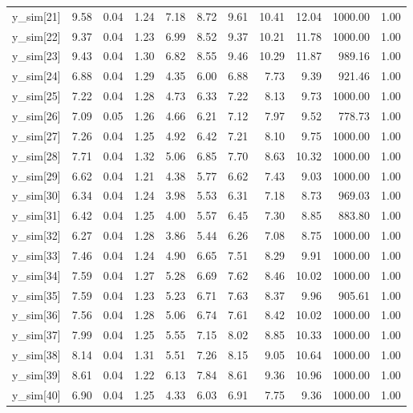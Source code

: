 \begin{table}[ht]
\begin{tabular}{rrrrrrrrrrr}
  y\_sim[21] & 9.58 & 0.04 & 1.24 & 7.18 & 8.72 & 9.61 & 10.41 & 12.04 & 1000.00 & 1.00 \\ 
  y\_sim[22] & 9.37 & 0.04 & 1.23 & 6.99 & 8.52 & 9.37 & 10.21 & 11.78 & 1000.00 & 1.00 \\ 
  y\_sim[23] & 9.43 & 0.04 & 1.30 & 6.82 & 8.55 & 9.46 & 10.29 & 11.87 & 989.16 & 1.00 \\ 
  y\_sim[24] & 6.88 & 0.04 & 1.29 & 4.35 & 6.00 & 6.88 & 7.73 & 9.39 & 921.46 & 1.00 \\ 
  y\_sim[25] & 7.22 & 0.04 & 1.28 & 4.73 & 6.33 & 7.22 & 8.13 & 9.73 & 1000.00 & 1.00 \\ 
  y\_sim[26] & 7.09 & 0.05 & 1.26 & 4.66 & 6.21 & 7.12 & 7.97 & 9.52 & 778.73 & 1.00 \\ 
  y\_sim[27] & 7.26 & 0.04 & 1.25 & 4.92 & 6.42 & 7.21 & 8.10 & 9.75 & 1000.00 & 1.00 \\ 
  y\_sim[28] & 7.71 & 0.04 & 1.32 & 5.06 & 6.85 & 7.70 & 8.63 & 10.32 & 1000.00 & 1.00 \\ 
  y\_sim[29] & 6.62 & 0.04 & 1.21 & 4.38 & 5.77 & 6.62 & 7.43 & 9.03 & 1000.00 & 1.00 \\ 
  y\_sim[30] & 6.34 & 0.04 & 1.24 & 3.98 & 5.53 & 6.31 & 7.18 & 8.73 & 969.03 & 1.00 \\ 
  y\_sim[31] & 6.42 & 0.04 & 1.25 & 4.00 & 5.57 & 6.45 & 7.30 & 8.85 & 883.80 & 1.00 \\ 
  y\_sim[32] & 6.27 & 0.04 & 1.28 & 3.86 & 5.44 & 6.26 & 7.08 & 8.75 & 1000.00 & 1.00 \\ 
  y\_sim[33] & 7.46 & 0.04 & 1.24 & 4.90 & 6.65 & 7.51 & 8.29 & 9.91 & 1000.00 & 1.00 \\ 
  y\_sim[34] & 7.59 & 0.04 & 1.27 & 5.28 & 6.69 & 7.62 & 8.46 & 10.02 & 1000.00 & 1.00 \\ 
  y\_sim[35] & 7.59 & 0.04 & 1.23 & 5.23 & 6.71 & 7.63 & 8.37 & 9.96 & 905.61 & 1.00 \\ 
  y\_sim[36] & 7.56 & 0.04 & 1.28 & 5.06 & 6.74 & 7.61 & 8.42 & 10.02 & 1000.00 & 1.00 \\ 
  y\_sim[37] & 7.99 & 0.04 & 1.25 & 5.55 & 7.15 & 8.02 & 8.85 & 10.33 & 1000.00 & 1.00 \\ 
  y\_sim[38] & 8.14 & 0.04 & 1.31 & 5.51 & 7.26 & 8.15 & 9.05 & 10.64 & 1000.00 & 1.00 \\ 
  y\_sim[39] & 8.61 & 0.04 & 1.22 & 6.13 & 7.84 & 8.61 & 9.36 & 10.96 & 1000.00 & 1.00 \\ 
  y\_sim[40] & 6.90 & 0.04 & 1.25 & 4.33 & 6.03 & 6.91 & 7.75 & 9.36 & 1000.00 & 1.00 \\ 

\end{tabular}
\end{table}
